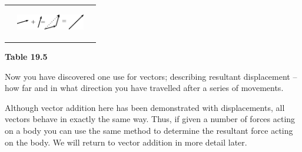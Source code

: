 \begin{center}
\begin{xtabular*}{\mytablewidth}[t]{|p{10\mystarwidth}|p{10\mystarwidth}|p{10\mystarwidth}|}
\begin{center}
      \vspace{2pt}
    \vspace{.1in}
    
    \end{center}



    \addtocounter{footnote}{-0}
    
                 &
    
    
        
                  
    \setcounter{subfigure}{0}

\label{m38813*id188793}
    \begin{center}
    \label{m38813*id188793!!!underscore!!!media}\label{m38813*id188793!!!underscore!!!printimage}\includegraphics[width=3cm]{col11305.imgs/m38813_PG11C1_028.png} %
        
      \vspace{2pt}
    \vspace{.1in}
    
    \end{center}



    \addtocounter{footnote}{-0}
    
     \tabularnewline{}
    \end{xtabular*}
      \end{center}
    \begin{center}{\small\bfseries Table 19.5}\end{center}
    
    \addtocounter{footnote}{-0}
    
    \par
  
        
        \label{m38813*id188804}Now you have discovered one use for vectors; describing resultant
displacement -- how far and in what direction you
have travelled after a series of movements.\par 
        \label{m38813*id188810}Although vector addition here has been demonstrated with
displacements, all vectors behave in exactly the same way. Thus, if
given a number of forces acting on a body you can use the same method
to determine the resultant force acting on the body. We will return to
vector addition in more detail later.\par 
      
